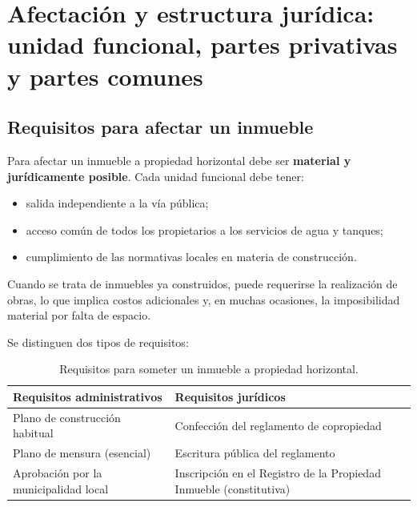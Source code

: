 \documentclass[12pt,oneside]{book}
\begin{document}
\chapter[Afectación y estructura jurídica]{Afectación y estructura jurídica: unidad funcional, partes privativas y partes comunes}

\section{Requisitos para afectar un inmueble}

Para afectar un inmueble a propiedad horizontal debe ser \textbf{material y jurídicamente posible}. Cada unidad funcional debe tener:

\begin{itemize}
    \item salida independiente a la vía pública;
    \item acceso común de todos los propietarios a los servicios de agua y tanques;
    \item cumplimiento de las normativas locales en materia de construcción.
\end{itemize}

Cuando se trata de inmuebles ya construidos, puede requerirse la realización de obras, lo que implica costos adicionales y, en muchas ocasiones, la imposibilidad material por falta de espacio.

Se distinguen dos tipos de requisitos:

\begin{table}[H]
\centering
\begin{tabularx}{\textwidth}{
    >{\raggedright\arraybackslash}X
    >{\raggedright\arraybackslash}X
}
\toprule
\textbf{Requisitos administrativos} & \textbf{Requisitos jurídicos} \\
\midrule
Plano de construcción habitual & Confección del reglamento de copropiedad \\
Plano de mensura (esencial) & Escritura pública del reglamento \\
Aprobación por la municipalidad local & Inscripción en el Registro de la Propiedad Inmueble (constitutiva) \\
\bottomrule
\end{tabularx}
\caption{Requisitos para someter un inmueble a propiedad horizontal.}
\end{table}
\end{document}
